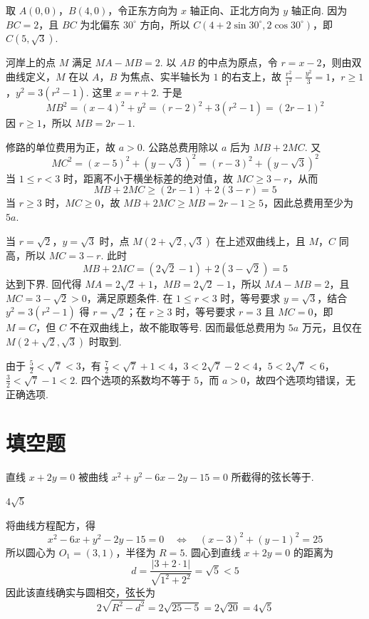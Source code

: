 \begin{solution}
取 \(A(0,0)\)，\(B(4,0)\)，令正东方向为 \(x\) 轴正向、正北方向为 \(y\) 轴正向. 因为 \(BC=2\)，且 \(BC\) 为北偏东 \(30^{\circ}\) 方向，所以 \(C(4+2\sin30^{\circ},2\cos30^{\circ})\)，即 \(C(5,\sqrt3)\).

河岸上的点 \(M\) 满足 \(MA-MB=2\). 以 \(AB\) 的中点为原点，令 \(r=x-2\)，则由双曲线定义，\(M\) 在以 \(A\)，\(B\) 为焦点、实半轴长为 \(1\) 的右支上，故
\(\frac{r^2}{1^2}-\frac{y^2}{3}=1\)，\(r\geq1\)，\(y^2=3(r^2-1)\).
这里 \(x=r+2\). 于是
\[
MB^2=(x-4)^2+y^2=(r-2)^2+3(r^2-1)=(2r-1)^2
\]
因 \(r\geq1\)，所以 \(MB=2r-1\).

修路的单位费用为正，故 \(a>0\). 公路总费用除以 \(a\) 后为
\(MB+2MC\). 又
\[
MC^2=(x-5)^2+(y-\sqrt3)^2=(r-3)^2+(y-\sqrt3)^2
\]
当 \(1\leq r<3\) 时，距离不小于横坐标差的绝对值，故 \(MC\geq3-r\)，从而
\[
MB+2MC\geq(2r-1)+2(3-r)=5
\]
当 \(r\geq3\) 时，\(MC\geq0\)，故
\(MB+2MC\geq MB=2r-1\geq5\)，因此总费用至少为 \(5a\).

当 \(r=\sqrt2\)，\(y=\sqrt3\) 时，点 \(M(2+\sqrt2,\sqrt3)\) 在上述双曲线上，且 \(M\)，\(C\) 同高，所以 \(MC=3-r\). 此时
\[
MB+2MC=(2\sqrt2-1)+2(3-\sqrt2)=5
\]
达到下界. 回代得 \(MA=2\sqrt2+1\)，\(MB=2\sqrt2-1\)，所以 \(MA-MB=2\)，且 \(MC=3-\sqrt2>0\)，满足原题条件. 在 \(1\leq r<3\) 时，等号要求 \(y=\sqrt3\)，结合 \(y^2=3(r^2-1)\) 得 \(r=\sqrt2\)；在 \(r\geq3\) 时，等号要求 \(r=3\) 且 \(MC=0\)，即 \(M=C\)，但 \(C\) 不在双曲线上，故不能取等号. 因而最低总费用为 \(5a\text{ 万元}\)，且仅在 \(M(2+\sqrt2,\sqrt3)\) 时取到.

由于 \(\frac52<\sqrt7<3\)，有 \(\frac72<\sqrt7+1<4\)，\(3<2\sqrt7-2<4\)，\(5<2\sqrt7<6\)，\(\frac32<\sqrt7-1<2\). 四个选项的系数均不等于 \(5\)，而 \(a>0\)，故四个选项均错误，无正确选项.
\end{solution}

\section{填空题}
\begin{problem}
直线 \(x + 2y = 0\) 被曲线 \(x^{2} + y^{2} - 6x - 2y - 15 = 0\) 所截得的弦长等于\fillinblank{}.
\end{problem}

\begin{answer}
\(4\sqrt{5}\)
\end{answer}

\begin{solution}
将曲线方程配方，得
\[
x^2-6x+y^2-2y-15=0
\quad\Longleftrightarrow\quad
(x-3)^2+(y-1)^2=25
\]
所以圆心为 \(O_1=(3,1)\)，半径为 \(R=5\). 圆心到直线 \(x+2y=0\) 的距离为
\[
d=\frac{|3+2\cdot1|}{\sqrt{1^2+2^2}}=\sqrt5<5
\]
因此该直线确实与圆相交，弦长为
\[
2\sqrt{R^2-d^2}=2\sqrt{25-5}=2\sqrt{20}=4\sqrt5
\]
\end{solution}

